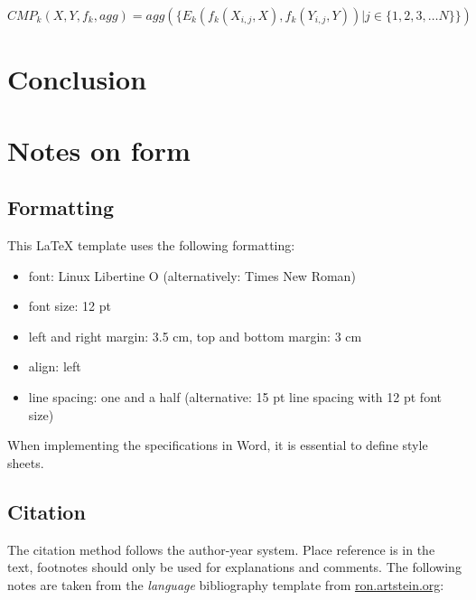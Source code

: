 \documentclass[12pt,letterpaper]{article}
\begin{document}
\[ CMP_k(X,Y,f_k,agg) = agg(\{E_k(f_k(X_{i,j},X),f_k(Y_{i,j},Y)) | j \in \{1,2,3, \dots N\}\})\]


\section{Conclusion}


\section{Notes on form}
\subsection{Formatting} 
This LaTeX template uses the following formatting:
\begin{itemize}
\setlength{\itemsep}{0pt}
	\item font: Linux Libertine O (alternatively: Times New Roman)
	\item font size: 12 pt
	\item left and right margin: 3.5 cm, top and bottom margin: 3 cm
    \item align: left
	\item line spacing: one and a half (alternative: 15 pt line spacing with 12 pt font size)
\end{itemize}

\noindent
When implementing the specifications in Word, it is essential to define style sheets.

\subsection{Citation} 
\label{sec:cit}

The citation method follows the author-year system. Place reference is in the text, footnotes should only be used for explanations and comments. The following notes are taken from the \emph{language} bibliography template from \url{ron.artstein.org}:\newline
\end{document}
